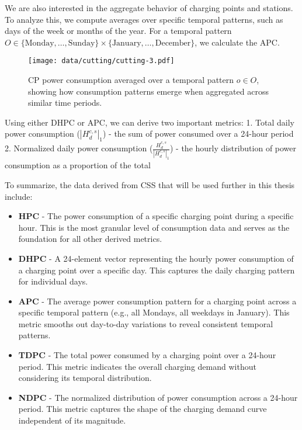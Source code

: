 We are also interested in the aggregate behavior of charging points and stations. To analyze this, we compute averages over specific temporal patterns, such as days of the week or months of the year. For a temporal pattern $O \in \{\text{Monday}, \dots, \text{Sunday} \} \times \{ \text{January}, \dots, \text{December} \}$, we calculate the \acrlong{APC}.

\begin{figure}
    \texttt{[image: data/cutting/cutting-3.pdf]}
    \caption{\acrlong{CP} power consumption averaged over a temporal pattern $o \in O$, showing how consumption patterns emerge when aggregated across similar time periods.}
\end{figure}

Using either \acrlong{DHPC} or \acrlong{APC}, we can derive two important metrics:
1. Total daily power consumption ($|H^{c,s}_{d}|_1$) - the sum of power consumed over a 24-hour period
2. Normalized daily power consumption ($\frac{H^{c,s}_d}{|H^{c,s}_d|_1}$) - the hourly distribution of power consumption as a proportion of the total

To summarize, the data derived from \acrlong{CSS} that will be used further in this thesis include:

\begin{itemize}
    \item \textbf{\acrlong{HPC}} - The power consumption of a specific charging point during a specific hour. This is the most granular level of consumption data and serves as the foundation for all other derived metrics.

    \item \textbf{\acrlong{DHPC}} - A 24-element vector representing the hourly power consumption of a charging point over a specific day. This captures the daily charging pattern for individual days.

    \item \textbf{\acrlong{APC}} - The average power consumption pattern for a charging point across a specific temporal pattern (e.g., all Mondays, all weekdays in January). This metric smooths out day-to-day variations to reveal consistent temporal patterns.

    \item \textbf{\acrlong{TDPC}} - The total power consumed by a charging point over a 24-hour period. This metric indicates the overall charging demand without considering its temporal distribution.

    \item \textbf{\acrlong{NDPC}} - The normalized distribution of power consumption across a 24-hour period. This metric captures the shape of the charging demand curve independent of its magnitude.
\end{itemize}



